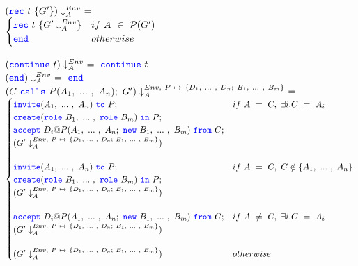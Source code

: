 \documentclass[12pt,twoside]{report}
\begin{document}
 $(\rec\ t\ \{G'\}) \project\ =$\\[3.5pt]
 \begin{math}
    \begin{cases}
        {\color{blue}\mathtt{rec}}\ t\ \{G' \downarrow_A^{Env}\} & if\ A\ \in\ \mathcal{P}(G')\\
        {\color{blue}\mathtt{end}} & otherwise
    \end{cases}\\\\
\end{math}
 
 $(\continue\ t) \project\ =\ \continue\ t$\\
 
 $({\color{blue}\mathtt{end}}) \downarrow_A^{Env}\ =\ {\color{blue}\mathtt{end}}$\\
 
 $(C\ \calls\ P(\roles{A}{n});\ G') \projectenv{Env,\ P\ \mapsto\ \{\roles{D}{n};\ \roles{B}{m}\}}\ =$\\[3.5pt]
 \begin{math}
    \begin{cases}
        \invite(\roles{A}{n})\ \scrto\ P; & if\ A\ =\ C,\ \exists i. C\ =\ A_i\\[0.25pt]
        \create(\rolessig{B}{m})\ \scrin\ P; & \\[0.25pt]
        \accept\ D_i@P(\roles{A}{n};\ \scrnew\ \roles{B}{m})\ \from\ C; & \\[0.25pt]
        (G' \projectenv{Env,\ P\ \mapsto\ \{\roles{D}{n};\ \roles{B}{m}\}}) & \\[13pt]

        \invite(\roles{A}{n})\ \scrto\ P; & if\ A\ =\ C,\ C \notin \{A_1,\ ...\ ,\ A_n\} \\[0.25pt]
        \create(\rolessig{B}{m})\ \scrin\ P; &\\[0.25pt]
        (G' \projectenv{Env,\ P\ \mapsto\ \{\roles{D}{n};\ \roles{B}{m}\}}) &\\[13pt]

        \accept\ D_i@P(\roles{A}{n};\ \scrnew\ \roles{B}{m})\ \from\ C; & if\ A\ \neq\ C,\ \exists i. C\ =\ A_i\\[0.25pt]
        (G' \projectenv{Env,\ P\ \mapsto\ \{\roles{D}{n};\ \roles{B}{m}\}}) & \\[13pt]

        (G' \projectenv{Env,\ P\ \mapsto\ \{\roles{D}{n};\ \roles{B}{m}\}}) & otherwise
    \end{cases}\\\\
\end{math}
\end{document}

